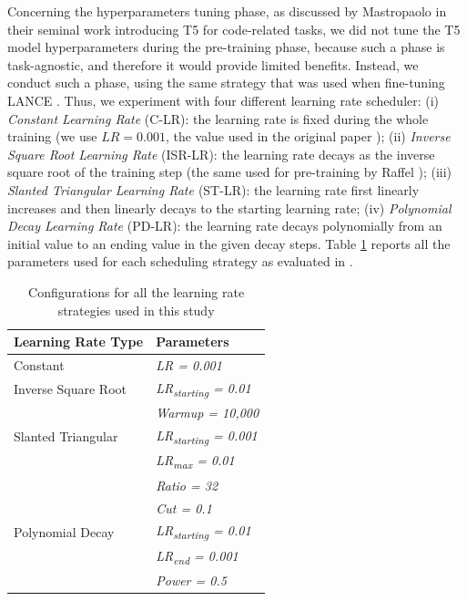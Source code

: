 Concerning the hyperparameters tuning phase, as discussed by Mastropaolo \etal \cite{mastropaolo2021studying} in their seminal work introducing T5 for code-related tasks, we did not tune the T5 model hyperparameters during the pre-training phase, because such a phase is task-agnostic, and therefore it would provide limited benefits. Instead, we conduct such a phase, using the same strategy that was used when fine-tuning LANCE  \cite{mastropaolo2022using}. Thus, we experiment with four different learning rate scheduler: (i) \textit{Constant Learning Rate} (C-LR): the learning rate is fixed during the whole training (we use $LR = 0.001$, \ie the value used in the original paper \cite{raffel2019exploring}); (ii) \textit{Inverse Square Root Learning Rate} (ISR-LR): the learning rate decays as the inverse square root of the training step (the same used for pre-training by Raffel \etal); (iii) \textit{Slanted Triangular Learning Rate \cite{howard2018universal}} (ST-LR): the learning rate first linearly increases and then linearly decays to the starting learning rate;  (iv) \textit{Polynomial Decay Learning Rate} (PD-LR): the learning rate decays polynomially from an initial value to an ending value in the given decay steps.
Table \ref{tab:learning-rates} reports all the parameters used for each scheduling strategy as evaluated in \cite{mastropaolo2022using}.

\begin{table}[h]
	\centering
	\begin{tabular}{ll}
		\hline
		\textbf{Learning Rate Type} & \textbf{Parameters}               \\ \hline
		Constant                     & \textit{LR = 0.001}               \\
		Inverse Square Root         & \textit{LR\textsubscript{starting} = 0.01}  \\
		& \textit{Warmup = 10,000}          \\
		Slanted Triangular          & \textit{LR\textsubscript{starting} = 0.001} \\
		& \textit{LR\textsubscript{max} = 0.01}       \\
		& \textit{Ratio = 32}               \\
		& \textit{Cut = 0.1}                \\
		Polynomial Decay            & \textit{LR\textsubscript{starting} = 0.01}  \\
		& \textit{LR\textsubscript{end} = 0.001}      \\
		& \textit{Power = 0.5}              \\ \hline
	\end{tabular}
	\vspace{0.2cm}
	\caption{Configurations for all the learning rate strategies used in this study}
	\label{tab:learning-rates}
\end{table}


